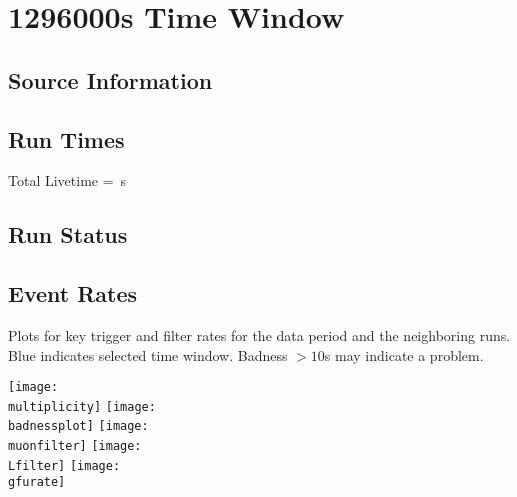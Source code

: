 \documentclass[titlepage]{article}
\begin{document}
\vfill


\pagebreak
\section{1296000s Time Window}

\subsection{Source Information}
\sourcetable

\subsection{Run Times}
\runtimetable

Total Livetime = \livetime\,s

\subsection{Run Status}
\runstatustable

\pagebreak
\subsection{Event Rates}
Plots for key trigger and filter rates for the data period
and the neighboring runs.  Blue indicates selected time window.
Badness $>10$s may indicate a problem.

\vspace{1em}
{
 \centering
 \texttt{[image: \\multiplicity]}
 \texttt{[image: \\badnessplot]}
 \texttt{[image: \\muonfilter]}
 \texttt{[image: \\Lfilter]}
 \texttt{[image: \\gfurate]}
}


%
%
%
%
%
%
%
\end{document}
